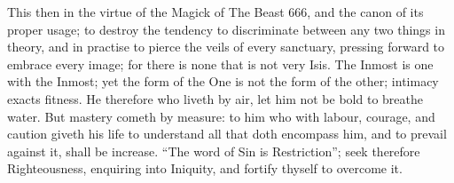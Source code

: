 This then in the virtue of the Magick of The Beast 666, and the canon of its proper usage; to destroy the tendency to discriminate between any two things in theory, and in practise to pierce the veils of every sanctuary, pressing forward to embrace every image; for there is none that is not very Isis. The Inmost is one with the Inmost; yet the form of the One is not the form of the other; intimacy exacts fitness. He therefore who liveth by air, let him not be bold to breathe water. But mastery cometh by measure: to him who with labour, courage, and caution giveth his life to understand all that doth encompass him, and to prevail against it, shall be increase. \enquote{The word of Sin is Restriction}; seek therefore Righteousness, enquiring into Iniquity, and fortify thyself to overcome it.


